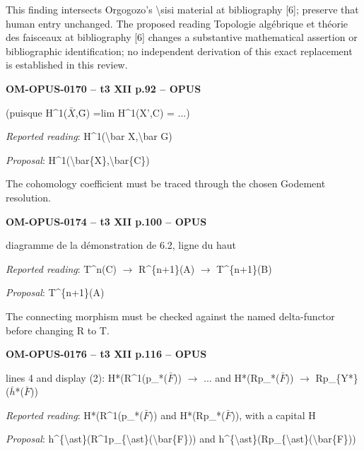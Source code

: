 This finding intersects Orgogozo's \textbackslash{}sisi material at bibliography [6]; preserve that human entry unchanged. The proposed reading Topologie algébrique et théorie des faisceaux at bibliography [6] changes a substantive mathematical assertion or bibliographic identification; no independent derivation of this exact replacement is established in this review.\par
\par\noindent\textbf{OM-OPUS-0170 -- t3 XII p.92 -- OPUS}\par
(puisque H\textasciicircum{}1(\ensuremath{\bar{X}},Ḡ) =\allowbreak  lim H\textasciicircum{}1(X',C) = ...)\par
\emph{Reported reading}: H\textasciicircum{}1(\textbackslash{}bar X,\textbackslash{}bar G)\par
\emph{Proposal}: H\textasciicircum{}1(\textbackslash{}bar\{X\},\textbackslash{}bar\{C\})\par
The cohomology coefficient must be traced through the chosen Godement resolution.\par
\par\noindent\textbf{OM-OPUS-0174 -- t3 XII p.100 -- OPUS}\par
diagramme de la démonstration de 6.2, ligne du haut\par
\emph{Reported reading}: T\textasciicircum{}n(C) \ensuremath{\to} R\textasciicircum{}\{n+1\}(A) \ensuremath{\to} T\textasciicircum{}\{n+1\}(B)\par
\emph{Proposal}: T\textasciicircum{}\{n+1\}(A)\par
The connecting morphism must be checked against the named delta-functor before changing R to T.\par
\par\noindent\textbf{OM-OPUS-0176 -- t3 XII p.116 -- OPUS}\par
lines 4 and display (2): H*(R\textasciicircum{}1(p\_*(\ensuremath{\bar{F}})) \ensuremath{\to} ... and H*(Rp\_*(\ensuremath{\bar{F}})) \ensuremath{\to} Rp\_\{Y*\}(\ensuremath{\bar{h}}*(\ensuremath{\bar{F}}))\par
\emph{Reported reading}: H*(R\textasciicircum{}1(p\_*(\ensuremath{\bar{F}})) and H*(Rp\_*(\ensuremath{\bar{F}})), with a capital H\par
\emph{Proposal}: h\textasciicircum{}\{\textbackslash{}ast\}(R\textasciicircum{}1p\_\{\textbackslash{}ast\}(\textbackslash{}bar\{F\})) and h\textasciicircum{}\{\textbackslash{}ast\}(Rp\_\{\textbackslash{}ast\}(\textbackslash{}bar\{F\}))\par
